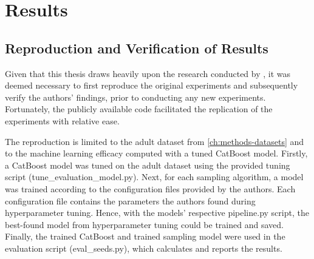 \chapter{Results}
\label{ch:results}

\section{Reproduction and Verification of Results}
\label{ch:results-reproduction}

Given that this thesis draws heavily upon the research conducted by \cite{kotelnikov2022TabDDPMModellingTabular},
it was deemed necessary to first reproduce the original experiments and subsequently verify the authors' findings,
prior to conducting any new experiments.
Fortunately, the publicly available code \cite{akim2023TabDDPMModellingTabular} facilitated the replication of the experiments with relative ease.

The reproduction is limited to the adult dataset from \autoref{ch:methods-datasets} and to the machine learning efficacy computed with a tuned CatBoost \cite{prokhorenkova2018CatBoostUnbiasedBoosting} model.
Firstly, a CatBoost model was tuned on the adult dataset using the provided tuning script (tune\_evaluation\_model.py).
Next, for each sampling algorithm, a model was trained according to the configuration files provided by the authors.
Each configuration file contains the parameters the authors found during hyperparameter tuning.
Hence, with the models' respective pipeline.py script, the best-found model from hyperparameter tuning could be trained and saved.
Finally, the trained CatBoost and trained sampling model were used in the evaluation script (eval\_seeds.py), which calculates and reports the results.

